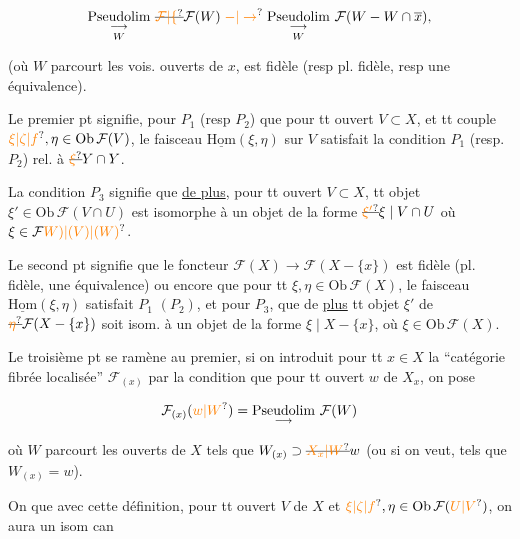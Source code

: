 \[
\underset{W}{\underset{\longrightarrow}{\mathrm{Pseudolim}}}\ \deleted{\unsure{\mathcal F|\{}}\mathcal F(W)\mathrel{\unsure{-|\to}}
\underset{W}{\underset{\longrightarrow}{\mathrm{Pseudolim}}}\ \mathcal F(W-W\cap\overline x),
\]

(où $W$ parcourt les vois. ouverts de $x$, est  fidèle (resp pl. fidèle, resp une équivalence).


Le premier pt signifie, pour $P_1$ (resp $P_2$) que pour tt ouvert $V\subset X$, et tt couple $\unsure{\xi|\zeta|f},\eta\in\mathrm{Ob}\,\mathcal F(V)$, le faisceau $\underline{\mathrm{Hom}}(\xi,\eta)$ sur $V$ satisfait la condition $P_1$ (resp. $P_2$) rel. à $\deleted{\unsure{\xi}}Y\cap Y$.

La condition $P_3$ signifie que \uline{de plus}, pour tt ouvert $V\subset X$,  tt objet $\xi'\in\mathrm{Ob}\,\mathcal F(V\cap U)$ est isomorphe à un objet de la forme $\deleted{\unsure{\xi'}}\xi\mid V\cap U$ où $\xi\in\mathcal F\unsure{W)|(V)|(W)}$.

Le second pt signifie que le foncteur $\mathcal F(X)\longrightarrow\mathcal F(X-\{x\})$ est fidèle  (pl. fidèle, une équivalence)  ou encore  que pour tt $\xi,\eta\in\mathrm{Ob}\,\mathcal F(X)$, le faisceau $\underline{\mathrm{Hom}}(\xi,\eta)$ satisfait $P_1$ $(P_2)$, et pour $P_3$, que de \uline{plus} tt objet  $\xi'$ de $\deleted{\unsure{\eta}}\mathcal F(X-\{x\})$ soit isom. à un objet de la forme  $\xi\mid X-\{x\}$, où $\xi\in\mathrm{Ob}\,\mathcal F(X)$.


Le troisième pt se ramène au premier, si on introduit pour tt $x\in X$ la ``catégorie fibrée localisée'' $\mathcal F_{(x)}$ par la condition que pour tt ouvert   $w$ de $X_x$, on pose

\[
\mathcal F_{(x)}(\unsure{w|W})=\underset{\longrightarrow}{\mathrm{Pseudolim}}\ \mathcal F(W)
\]

où $W$ parcourt les ouverts de $X$ tels que $W_{(x)}\supset\deleted{\unsure{X_x|W}}w$ (ou si on veut, tels que $W_{(x)}=w$). 

On  que avec cette définition, pour tt ouvert $V$ de $X$ et  $\unsure{\xi|\zeta|f},\eta\in\mathrm{Ob}\,\mathcal F(\unsure{U|V})$, on aura  un isom can

